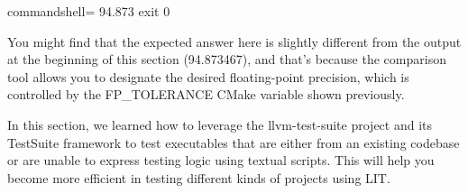 \begin{tcblisting}{commandshell={}}
94.873
exit 0
\end{tcblisting}

You might find that the expected answer here is slightly different from the output at the beginning of this section (94.873467), and that's because the comparison tool allows you to designate the desired floating-point precision, which is controlled by the FP\_TOLERANCE CMake variable shown previously.

In this section, we learned how to leverage the llvm-test-suite project and its TestSuite framework to test executables that are either from an existing codebase or are unable to express testing logic using textual scripts. This will help you become more efficient in testing different kinds of projects using LIT.




























